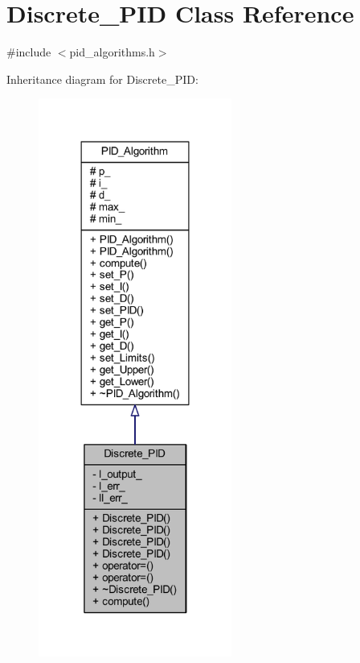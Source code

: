 \hypertarget{class_discrete___p_i_d}{}\section{Discrete\+\_\+\+P\+ID Class Reference}
\label{class_discrete___p_i_d}


{\ttfamily \#include $<$pid\+\_\+algorithms.\+h$>$}



Inheritance diagram for Discrete\+\_\+\+P\+ID\+:
\nopagebreak
\begin{figure}[H]
\begin{center}
\leavevmode
\includegraphics[width=180pt]{class_discrete___p_i_d__inherit__graph}
\end{center}
\end{figure}


